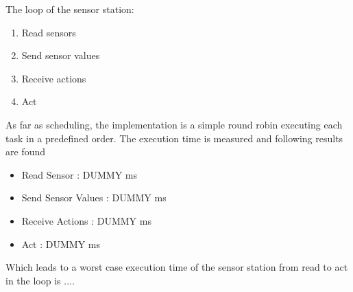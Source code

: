 The loop of the sensor station:
\begin{enumerate}
  \item Read sensors
  \item Send sensor values
  \item Receive actions
  \item Act
\end{enumerate}

As far as scheduling, the implementation is a simple round robin executing each task in a predefined order. The execution time is measured and following results are found
 \begin{itemize}
  \item Read Sensor : DUMMY ms
  \item Send Sensor Values : DUMMY ms
  \item Receive Actions : DUMMY ms
  \item Act : DUMMY ms 
\end{itemize}

Which leads to a worst case execution time of the sensor station from read to act in the loop is .... 
